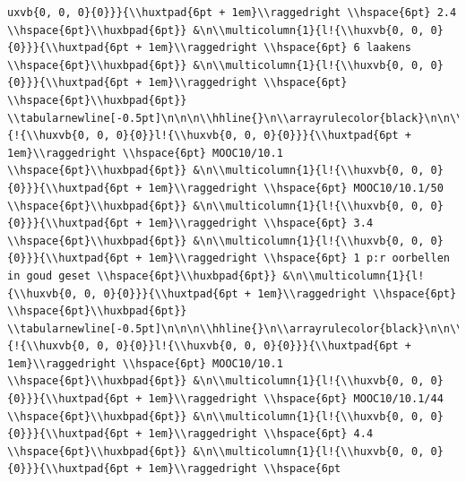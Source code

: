 \documentclass[11pt,preprint, authoryear]{elsarticle}
\numberwithin{equation}{section}
\numberwithin{figure}{section}
\numberwithin{table}{section}
\begin{document}
\begin{verbatim}
uxvb{0, 0, 0}{0}}}{\\huxtpad{6pt + 1em}\\raggedright \\hspace{6pt} 2.4 \\hspace{6pt}\\huxbpad{6pt}} &\n\\multicolumn{1}{l!{\\huxvb{0, 0, 0}{0}}}{\\huxtpad{6pt + 1em}\\raggedright \\hspace{6pt} 6 laakens \\hspace{6pt}\\huxbpad{6pt}} &\n\\multicolumn{1}{l!{\\huxvb{0, 0, 0}{0}}}{\\huxtpad{6pt + 1em}\\raggedright \\hspace{6pt}  \\hspace{6pt}\\huxbpad{6pt}} \\tabularnewline[-0.5pt]\n\n\n\\hhline{}\n\\arrayrulecolor{black}\n\n\\multicolumn{1}{!{\\huxvb{0, 0, 0}{0}}l!{\\huxvb{0, 0, 0}{0}}}{\\huxtpad{6pt + 1em}\\raggedright \\hspace{6pt} MOOC10/10.1 \\hspace{6pt}\\huxbpad{6pt}} &\n\\multicolumn{1}{l!{\\huxvb{0, 0, 0}{0}}}{\\huxtpad{6pt + 1em}\\raggedright \\hspace{6pt} MOOC10/10.1/50 \\hspace{6pt}\\huxbpad{6pt}} &\n\\multicolumn{1}{l!{\\huxvb{0, 0, 0}{0}}}{\\huxtpad{6pt + 1em}\\raggedright \\hspace{6pt} 3.4 \\hspace{6pt}\\huxbpad{6pt}} &\n\\multicolumn{1}{l!{\\huxvb{0, 0, 0}{0}}}{\\huxtpad{6pt + 1em}\\raggedright \\hspace{6pt} 1 p:r oorbellen in goud geset \\hspace{6pt}\\huxbpad{6pt}} &\n\\multicolumn{1}{l!{\\huxvb{0, 0, 0}{0}}}{\\huxtpad{6pt + 1em}\\raggedright \\hspace{6pt}  \\hspace{6pt}\\huxbpad{6pt}} \\tabularnewline[-0.5pt]\n\n\n\\hhline{}\n\\arrayrulecolor{black}\n\n\\multicolumn{1}{!{\\huxvb{0, 0, 0}{0}}l!{\\huxvb{0, 0, 0}{0}}}{\\huxtpad{6pt + 1em}\\raggedright \\hspace{6pt} MOOC10/10.1 \\hspace{6pt}\\huxbpad{6pt}} &\n\\multicolumn{1}{l!{\\huxvb{0, 0, 0}{0}}}{\\huxtpad{6pt + 1em}\\raggedright \\hspace{6pt} MOOC10/10.1/44 \\hspace{6pt}\\huxbpad{6pt}} &\n\\multicolumn{1}{l!{\\huxvb{0, 0, 0}{0}}}{\\huxtpad{6pt + 1em}\\raggedright \\hspace{6pt} 4.4 \\hspace{6pt}\\huxbpad{6pt}} &\n\\multicolumn{1}{l!{\\huxvb{0, 0, 0}{0}}}{\\huxtpad{6pt + 1em}\\raggedright \\hspace{6pt
\end{verbatim}
\end{document}
